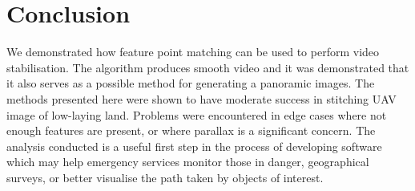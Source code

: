 \section{Conclusion}

We demonstrated how feature point matching can be used to perform video stabilisation.
The algorithm produces smooth video and it was demonstrated that it also serves as a possible method for generating a panoramic images.
The methods presented here were shown to have moderate success in stitching UAV image of low-laying land.
Problems were encountered in edge cases where not enough features are present,
or where parallax is a significant concern.
The analysis conducted is a useful first step in the process of developing software which may help emergency services monitor those in danger, geographical surveys, or better visualise the path taken by objects of interest.

